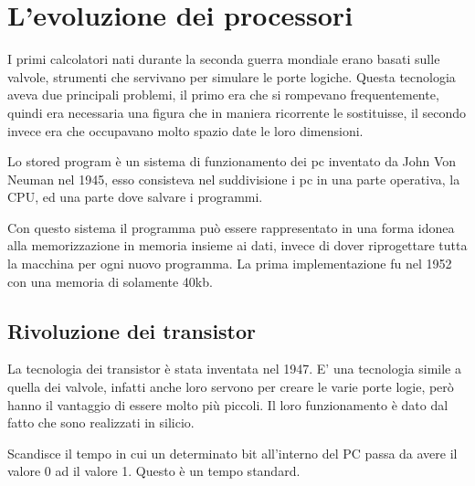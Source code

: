 \section{L'evoluzione dei processori}

I primi calcolatori nati durante la seconda guerra mondiale erano basati sulle valvole, strumenti che servivano per simulare le porte logiche. Questa tecnologia aveva due principali problemi, il primo era che si rompevano frequentemente, quindi era necessaria una figura che in maniera ricorrente le sostituisse, il secondo invece era che occupavano molto spazio date le loro dimensioni.
\begin{definition}
Lo stored program è un sistema di funzionamento dei pc inventato da John Von Neuman nel 1945, esso consisteva nel suddivisione i pc in una parte operativa, la CPU, ed una parte dove salvare i programmi. 
\end{definition}

\hspace{-15pt}Con questo sistema il programma può essere rappresentato in una forma idonea alla memorizzazione in memoria insieme ai dati, invece di dover riprogettare tutta la macchina per ogni nuovo programma. La prima implementazione fu nel 1952 con una memoria di solamente 40kb.

\subsection{Rivoluzione dei transistor}
La tecnologia dei transistor è stata inventata nel 1947. E' una tecnologia simile a quella dei valvole, infatti anche loro servono per creare le varie porte logie, però hanno il vantaggio di essere molto più piccoli. Il loro funzionamento è dato dal fatto che sono realizzati in silicio.

\begin{definition}
Scandisce il tempo in cui un determinato bit all'interno del PC passa da avere il valore 0 ad il valore 1. Questo è un tempo standard.
\end{definition}


